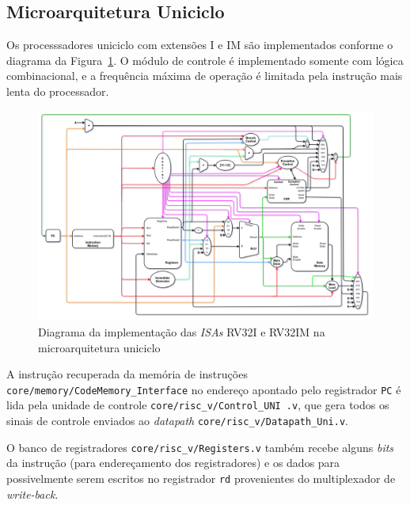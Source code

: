     \subsection{Microarquitetura Uniciclo}

        { Os processsadores uniciclo com extensões I e IM são implementados
            conforme o diagrama da Figura~\ref{fig:diagram_rv32i_uni}. O módulo
            de controle é implementado somente com lógica combinacional, e a
            frequência máxima de operação é limitada pela instrução mais lenta
            do processador.
        }

        \begin{figure}[H]
        \centering
            \includegraphics[angle=90,width=1\textwidth,height=.73\textheight,keepaspectratio]{../images/uarch_diagrams/singlecycle-RV32I-RV32IM.png}
            \caption{Diagrama da implementação das \textit{ISAs} RV32I e RV32IM na
            microarquitetura uniciclo}\label{fig:diagram_rv32i_uni}
        \end{figure}

        { A instrução recuperada da memória de instruções \texttt{core/memory/CodeMemory\_Interface}
            no endereço apontado pelo registrador \texttt{PC} é lida pela unidade de controle
            \texttt{core/risc\_v/Control\_UNI .v}, que gera todos os sinais de
            controle enviados ao \textit{datapath} \texttt{core/risc\_v/Datapath\_Uni.v}.
        }

        {
            O banco de registradores \texttt{core/risc\_v/Registers.v} também
            recebe alguns \textit{bits} da instrução (para endereçamento dos
            registradores) e os dados para possivelmente serem escritos no registrador
            \texttt{rd} provenientes do multiplexador de \textit{write-back}.
        }

